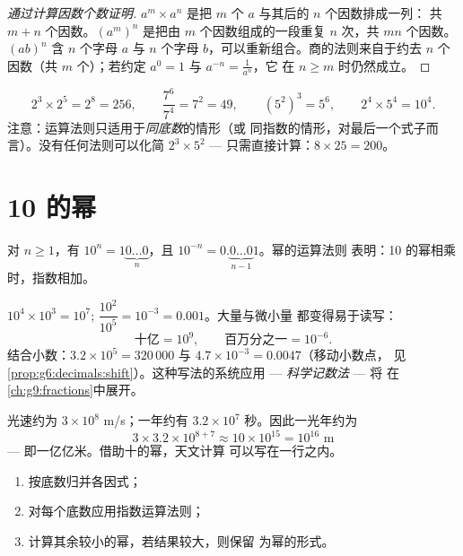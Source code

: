 \begin{proof}[通过计算因数个数证明]
$a^m \times a^n$ 是把 $m$ 个 $a$ 与其后的 $n$ 个因数排成一列：
共 $m + n$ 个因数。$\left(a^m\right)^n$ 是把由 $m$ 个因数组成的一段重复
$n$ 次，共 $mn$ 个因数。$(ab)^n$ 含 $n$ 个字母 $a$ 与 $n$
个字母 $b$，可以重新组合。商的法则来自于约去
$n$ 个因数（共 $m$ 个）；若约定
$a^0 = 1$ 与 $a^{-n} = \frac{1}{a^n}$，它
在 $n \geq m$ 时仍然成立。
\end{proof}

\begin{example}\label{ex:g8:powers:rules}
\[
2^3 \times 2^5 = 2^8 = 256,
\qquad
\frac{7^6}{7^4} = 7^2 = 49,
\qquad
\left(5^2\right)^3 = 5^6,
\qquad
2^4 \times 5^4 = 10^4 .
\]
注意：运算法则只适用于\emph{同底数}的情形（或
同指数的情形，对最后一个式子而言）。没有任何法则可以化简 $2^3 \times 5^2$ ---
只需直接计算：$8 \times 25 = 200$。
\end{example}

\section{10 的幂}

\begin{proposition}[10 的幂]\label{prop:g8:powers:ten}
对 $n \geq 1$，有 $10^n = 1\underbrace{0\dots0}_{n}$，且
$10^{-n} = 0.\underbrace{0\dots0}_{n-1}1$。幂的运算法则
表明：10 的幂相乘时，指数相加。
\end{proposition}

\begin{example}\label{ex:g8:powers:ten}
$10^4 \times 10^3 = 10^7$; \quad
$\dfrac{10^2}{10^5} = 10^{-3} = 0.001$。大量与微小量
都变得易于读写：
\[
\text{十亿} = 10^9,
\qquad
\text{百万分之一} = 10^{-6}.
\]
结合小数：$3.2 \times 10^5 = 320\,000$ 与
$4.7 \times 10^{-3} = 0.0047$（移动小数点，
见\cref{prop:g6:decimals:shift}）。这种写法的系统应用 ---
\emph{科学记数法} --- 将
在\cref{ch:g9:fractions}中展开。
\end{example}

\begin{example}[数量级]\label{ex:g8:powers:magnitude}
光速约为 $3 \times 10^8$ m/s；一年约有
$3.2 \times 10^7$ 秒。因此一光年约为
\[
3 \times 3.2 \times 10^{8+7} \approx 10 \times 10^{15} = 10^{16}
\text{ m}
\]
--- 即一亿亿米。借助十的幂，天文计算
可以写在一行之内。
\end{example}

\begin{method}[化简含幂的表达式]\label{met:g8:powers:simplify}
\begin{enumerate}
  \item 按底数归并各因式；
  \item 对每个底数应用指数运算法则；
  \item 计算其余较小的幂，若结果较大，则保留
        为幂的形式。
\end{enumerate}
\end{method}

